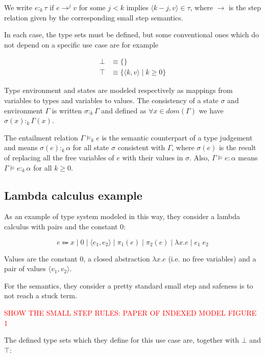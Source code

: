 \documentclass{article}
\begin{document}
We write $e :_k \tau$ if $e \rightarrow^j v$ for some $j < k$ 
implies $\langle k - j, v\rangle \in \tau$, where $\rightarrow$ 
is the step relation given by the corresponding small step 
semantics.

In each case, the type sets must be defined, but some conventional 
ones which do not depend on a specific use case are for example 

\begin{align*}
  \bot &\equiv \{\} \\ 
  \top &\equiv \{ \langle k, v \rangle\;|\; k \geq 0 \}
\end{align*}

Type environment and states are modeled respectively as mappings 
from variables to types and variables to values. The consistency 
of a state $\sigma$ and environment $\Gamma$ is written 
$\sigma :_k \Gamma$ and defined as $\forall x \in dom(\Gamma)$
we have $\sigma(x) :_k \Gamma(x)$.

The entailment relation $\Gamma \models_k e$ is the semantic 
counterpart of a type judgement and means 
$\sigma(e):_k \alpha$ for all state $\sigma$ consistent with 
$\Gamma$, where $\sigma(e)$ is the result of replacing all the 
free variables of $e$ with their values in $\sigma$. Also, 
$\Gamma \models e : \alpha$ means 
$\Gamma \models e :_k \alpha$ for all $k \geq 0$.

\subsection*{Lambda calculus example}

As an example of type system modeled in this way, they consider 
a lambda calculus with pairs and the constant $0$:

$$
  e \Coloneqq x 
      \;|\; 0 
      \;|\; \langle e_1, e_2 \rangle 
      \;|\; \pi_1(e) 
      \;|\; \pi_2(e)
      \;|\; \lambda x. e 
      \;|\; e_1\;e_2
$$

Values are the constant $0$, a closed abstraction 
$\lambda x.e$ (i.e. no free variables) and a pair of values 
$\langle v_1, v_2 \rangle$.

For the semantics, they consider a pretty standard small step and 
safeness is to not reach a stuck term.

\textcolor{red}{
  SHOW THE SMALL STEP RULES: PAPER OF INDEXED MODEL FIGURE 1
}

The defined type sets which they define for this use case are,
together with $\bot$ and $\top$:
\end{document}
